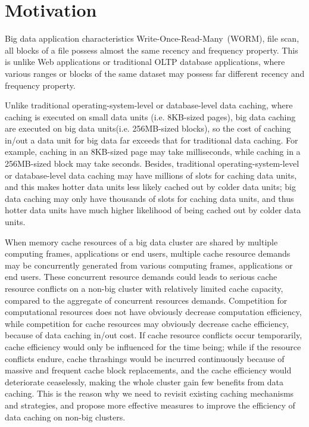 \section{Motivation}\label{sec:Motiv}

Big data application characteristics Write-Once-Read-Many~(WORM), file scan, all blocks of a file possess almost the same recency and frequency property. This is unlike Web applications or traditional OLTP database applications, where various ranges or blocks of the same dataset may possess far different recency and frequency property.

Unlike traditional operating-system-level or database-level data caching, where caching is executed on small data units (i.e. 8KB-sized pages), big data caching are executed on big data units(i.e. 256MB-sized blocks), so the cost of caching in/out a data unit for big data far exceeds that for traditional data caching. For example, caching in an 8KB-sized page may take milliseconds, while caching in a 256MB-sized block may take seconds. Besides, traditional operating-system-level or database-level data caching may have millions of slots for caching data units, and this makes hotter data units less likely cached out by colder data units; big data caching may only have thousands of slots for caching data units, and thus hotter data units have much higher likelihood of being cached out by colder data units.

When memory cache resources of a big data cluster are shared by multiple computing frames, applications or end users, multiple cache resource demands may be concurrently generated from various computing frames, applications or end users. These concurrent resource demands could leads to serious cache resource conflicts on a non-big cluster with relatively limited cache capacity, compared to the aggregate of concurrent resources demands. Competition for computational resources does not have obviously decrease computation efficiency, while competition for cache resources may obviously decrease cache efficiency, because of data caching in/out cost. If cache resource conflicts occur temporarily, cache efficiency would only be influenced for the time being; while if the resource conflicts endure, cache thrashings would be incurred continuously because of massive and frequent cache block replacements, and the cache efficiency would deteriorate ceaselessly, making the whole cluster gain few benefits from data caching. This is the reason why we need to revisit existing caching mechanisms and strategies, and propose more effective measures to improve the efficiency of data caching on non-big clusters.

